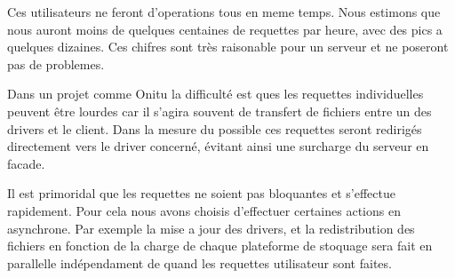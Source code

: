 Ces utilisateurs ne feront d'operations tous en meme temps. Nous estimons que nous auront moins de quelques centaines de requettes par heure, avec des pics a quelques dizaines. Ces chifres sont très raisonable pour un serveur et ne poseront pas de problemes.

Dans un projet comme Onitu la difficulté est ques les requettes individuelles peuvent être lourdes car il s'agira souvent de transfert de fichiers entre un des drivers et le client. Dans la mesure du possible ces requettes seront redirigés directement vers le driver concerné, évitant ainsi une surcharge du serveur en facade.

Il est primoridal que les requettes ne soient pas bloquantes et s'effectue rapidement. Pour cela nous avons choisis d'effectuer certaines actions en asynchrone. Par exemple la mise a jour des drivers, et la redistribution des fichiers en fonction de la charge de chaque plateforme de stoquage sera fait en parallelle indépendament de quand les requettes utilisateur sont faites.


